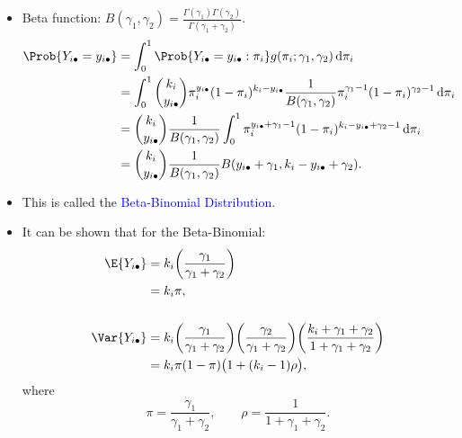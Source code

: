 \documentclass[oneside]{book}\usepackage[]{graphicx}\usepackage[svgnames]{xcolor}
\providecommand\given{} %
\renewcommand\given{\nonscript\:\delimsize\vert\nonscript\:\mathopen{}}%
\renewcommand\given{\nonscript\:\delimsize\vert\nonscript\:\mathopen{}}%
\renewcommand\given{\nonscript\:\delimsize\vert\nonscript\:\mathopen{}}%
\renewcommand\given{\nonscript\:\delimsize\vert\nonscript\:\mathopen{}}%
\renewcommand\given{\nonscript\:\delimsize\vert\nonscript\:\mathopen{}}%
\renewcommand\given{\nonscript\:\delimsize\vert\nonscript\:\mathopen{}}%
\renewcommand\given{\nonscript\:\delimsize\vert\nonscript\:\mathopen{}}%
\renewcommand\given{\nonscript\:\delimsize\vert\nonscript\:\mathopen{}}%
\renewcommand\given{\nonscript\:\delimsize\vert\nonscript\:\mathopen{}}%
\renewcommand\given{\nonscript\:\delimsize\vert\nonscript\:\mathopen{}}%
\renewcommand\given{\nonscript\:\delimsize\vert\nonscript\:\mathopen{}}%
\renewcommand\given{\nonscript\:\delimsize\vert\nonscript\:\mathopen{}}%
\renewcommand\given{:}
\begin{document}
\begin{enumerate}[1.]
\begin{itemize}
              \item Beta function: $ B(\gamma_1,\gamma_2)=\frac{\Gamma(\gamma_1)\Gamma(\gamma_2)}{\Gamma(\gamma_1+\gamma_2)} $.
                    \begin{align*}
                        \Prob{Y_{i\bullet}=y_{i\bullet}}
                         & =\int_{0}^{1}\Prob{Y_{i\bullet}=y_{i\bullet}\given \pi_i}g(\pi_i;\gamma_1,\gamma_2)\odif{\pi_i}                                                                          \\
                         & =\int_{0}^{1}\binom{k_i}{y_{i\bullet}}\pi_i^{y_{i\bullet}}(1-\pi_i)^{k_i-y_{i\bullet}}\frac{1}{B(\gamma_1,\gamma_2)}\pi_i^{\gamma_1-1}(1-\pi_i)^{\gamma_2-1}\odif{\pi_i} \\
                         & =\binom{k_i}{y_{i\bullet}}\frac{1}{B(\gamma_1,\gamma_2)}\int_{0}^{1}\pi_i^{y_{i\bullet}+\gamma_1-1}(1-\pi_i)^{k_i-y_{i\bullet}+\gamma_2-1}\odif{\pi_i}                   \\
                         & =\binom{k_i}{y_{i\bullet}}\frac{1}{B(\gamma_1,\gamma_2)}B(y_{i\bullet}+\gamma_1,k_i-y_{i\bullet}+\gamma_2).
                    \end{align*}
              \item This is called the \textcolor{Blue}{Beta-Binomial Distribution}.
              \item It can be shown that for the Beta-Binomial:
                    \begin{align*}
                        \E{Y_{i\bullet}}   & = k_i\biggl(\frac{\gamma_1}{\gamma_1+\gamma_2}\biggr)                                                                                                                \\
                                           & =k_i\pi,                                                                                                                                                             \\\\
                        \Var{Y_{i\bullet}} & = k_i\biggl(\frac{\gamma_1}{\gamma_1+\gamma_2}\biggr)\biggl(\frac{\gamma_2}{\gamma_1+\gamma_2}\biggr)\biggl(\frac{k_i+\gamma_1+\gamma_2}{1+\gamma_1+\gamma_2}\biggr) \\
                                           & =k_i\pi(1-\pi)\bigl(1+(k_i-1)\rho\bigr),
                    \end{align*}
                    where
                    \[ \pi=\frac{\gamma_1}{\gamma_1+\gamma_2},\qquad \rho=\frac{1}{1+\gamma_1+\gamma_2}. \]

\end{itemize}
\end{enumerate}
\end{document}
